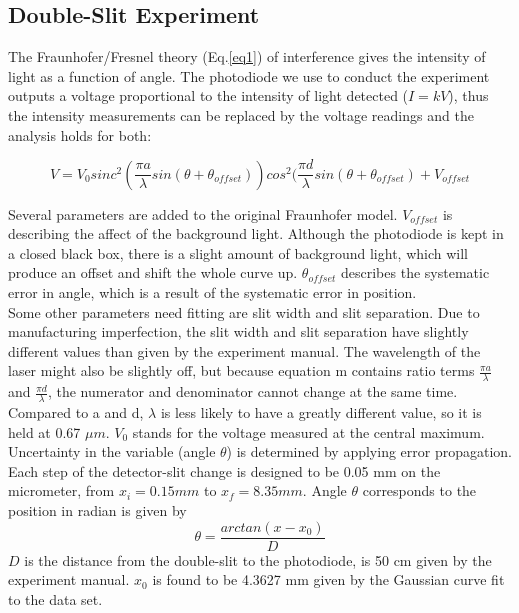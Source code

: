 \documentclass[prb,preprint]{revtex4-1}
\begin{document}
\subsection{Double-Slit Experiment}

The Fraunhofer/Fresnel theory (Eq.\ref{eq1}) of interference gives the intensity of light as a function of angle. The photodiode we use to conduct the experiment outputs a voltage proportional to the intensity of light detected ($I = kV$), thus the intensity measurements can be replaced by the voltage readings and the analysis holds for both:

\begin{equation}
V=V_0 sinc^2( \frac{\pi a}{\lambda} sin (\theta+\theta_{offset}))  cos^2(\frac{\pi d}{\lambda} sin (\theta+\theta_{offset}) + V_{offset}
\label{fitdouble}
\end{equation}

Several parameters are added to the original Fraunhofer model. $V_{offset}$ is describing the affect of the background light. Although the photodiode is kept in a closed black box, there is a slight amount of background light, which will produce an offset and shift the whole curve up. $\theta_{offset}$ describes the systematic error in angle, which is a result of the systematic error in position.\\

Some other parameters need fitting are slit width and slit separation. Due to manufacturing imperfection, the slit width and slit separation have slightly different values than given by the experiment manual. The wavelength of the laser might also be slightly off, but because equation m contains ratio terms $\frac{\pi a}{\lambda}$ and $\frac{\pi d}{\lambda}$, the numerator and denominator cannot change at the same time. Compared to a and d, $\lambda$ is less likely to have a greatly different value, so it is held at 0.67 $\mu m$. $V_{0}$ stands for the voltage measured at the central maximum.\\

Uncertainty in the variable (angle $\theta$) is determined by applying error propagation. Each step of the detector-slit change is designed to be 0.05 mm on the micrometer, from $x_i = 0.15 mm$ to $x_f = 8.35 mm$. Angle $\theta$ corresponds to the position in radian is given by
\begin{equation}
\theta = \frac{arctan(x-x_0)}{D}
\label{theta}
\end{equation}
$D$ is the distance from the double-slit to the photodiode, is 50 cm given by the experiment manual.
$x_0$ is found to be 4.3627 mm given by the Gaussian curve fit to the data set.
\end{document}
